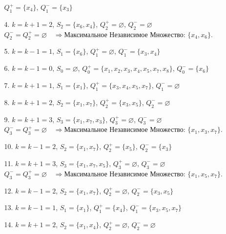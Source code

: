 \documentclass{article}
\begin{document}
\begin{enumerate}
\begin{enumerate}
        \quad  $Q_1^{+} =\{x_4\}$,
        \quad  $Q_1^{-} = \{x_3\}$
    \item[4.] $k = k + 1 = 2$,
        \quad $S_2 = \{x_6, x_4\}$,
        \quad  $Q_2^{+} =\varnothing$,
        \quad  $Q_2^{-} = \varnothing$\\
        $Q_2^{-} = Q_2^{+} = \varnothing\quad\Longrightarrow \textbf{Максимальное Независимое Множество: }\{x_4,x_6\}$.
    \item[5.] $k = k - 1 = 1$,
        \quad $S_1 = \{x_6\}$,
        \quad  $Q_1^{+} =\varnothing$,
        \quad  $Q_1^{-} = \{x_3,x_4\}$
    \item[6.] $k = k - 1 = 0$,
        \quad $S_0 =\varnothing$,
        \quad  $Q_0^{+} =\{x_1,x_2,x_3,x_4,x_5,x_7,x_8\}$,
        \quad  $Q_0^{-} = \{x_6\}$
    \item[7.] $k = k + 1 = 1$,
        \quad $S_1 =\{x_1\}$,
        \quad  $Q_1^{+} =\{x_3,x_4,x_5,x_7\}$,
        \quad  $Q_1^{-} = \varnothing$
    \item[8.] $k = k + 1 = 2$,
        \quad $S_2 =\{x_1, x_7\}$,
        \quad  $Q_2^{+} =\{x_3,x_5\}$,
        \quad  $Q_2^{-} = \varnothing$
    \item[9.] $k = k + 1 = 3$,
        \quad $S_3 =\{x_1,x_7, x_3\}$,
        \quad  $Q_3^{+} =\varnothing$,
        \quad  $Q_3^{-} = \varnothing$\\
        $Q_3^{-} = Q_3^{+} = \varnothing\quad\Longrightarrow \textbf{Максимальное Независимое Множество: }\{x_1, x_3,x_7\}$.
    \item[10.] $k = k - 1 = 2$,
        \quad $S_2 =\{x_1,x_7\}$,
        \quad  $Q_2^{+} =\{x_5\}$,
        \quad  $Q_2^{-} = \{x_3\}$
    \item[11.] $k = k + 1 = 3$,
        \quad $S_3 =\{x_1,x_7, x_5\}$,
        \quad  $Q_3^{+} =\varnothing$,
        \quad  $Q_3^{-} = \varnothing$\\
        $Q_3^{-} = Q_3^{+} = \varnothing\quad\Longrightarrow \textbf{Максимальное Независимое Множество: }\{x_1, x_5,x_7\}$.
    \item[12.] $k = k - 1 = 2$,
        \quad $S_2 =\{x_1,x_7\}$,
        \quad  $Q_2^{+} =\varnothing$,
        \quad  $Q_2^{-} = \{x_3,x_5\}$
    \item[13.] $k = k - 1 = 1$,
        \quad $S_1 =\{x_1\}$,
        \quad  $Q_1^{+} =\{x_4\}$,
        \quad  $Q_1^{-} = \{x_3,x_5,x_7\}$
    \item[14.] $k = k + 1 = 2$,
        \quad $S_2 =\{x_1,x_4\}$,
        \quad  $Q_2^{+} =\varnothing$,
        \quad  $Q_2^{-} = \varnothing$\\

\end{enumerate}
\end{enumerate}
\end{document}
